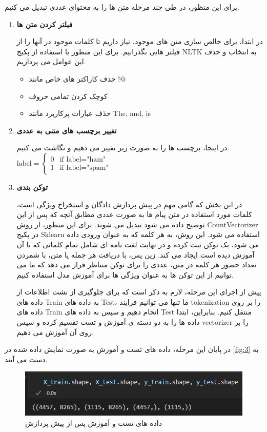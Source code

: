 \documentclass{article}
\begin{document}
برای این منظور، در طی چند مرحله متن ها را به محتوای عددی تبدیل می کنیم.
\begin{enumerate}
    \item \textbf{فیلتر کردن متن ها}
    
    در ابتدا، برای خالص سازی متن های موجود، نیاز داریم تا کلمات موجود در آنها را از فیلتر هایی بگذرانیم. برای این منظور با استفاده از پکیج NLTK
    به انتخاب و حذف این عوامل می پردازیم.
    \begin{itemize}
        \item حذف کاراکتر های خاص مانند $!@$
        \item کوچک کردن تمامی حروف
        \item حذف عبارات پرکاربرد مانند The, and, is
    \end{itemize}
    \item \textbf{تغییر برچسب های متنی به عددی}
    
    در اینجا، برچسب ها را به صورت زیر تغییر می دهیم و نگاشت می کنیم.
    $
\text{label} =
\begin{cases}
0 & \text{if } \text{label} = \text{"ham"} \\
1 & \text{if } \text{label} = \text{"spam"}
\end{cases}
$
\item \textbf{توکن بندی}

در این بخش که گامی مهم در پیش پردازش دادگان و استخراج ویژگی است، کلمات مورد استفاده در متن پیام ها به صورت عددی مطابق آنچه که پس از این توضیح داده می شود تبدیل می شوند. 
برای این منظور، از روش CountVectorizer در پکیج Sklearn استفاده می شود.
این روش، به هر کلمه که به عنوان ورودی داده می شود، یک توکن ثبت کرده و در نهایت لغت نامه ای شامل تمام کلماتی که با آن آموزش دیده است ایجاد می کند. زین پس، با دریافت هر جمله یا متن، با شمردن تعداد حضور هر کلمه در متن، عددی را برای توکن متناظر قرار می دهد که ما می توانیم از این توکن ها به عنوان ویژگی ها برای آموزش مدل استفاده کنیم.

پیش از اجرای این مرحله، لازم به ذکر است که برای جلوگیری از نشت اطلاعات از داده های Train به داده های Test، ما تنها می توانیم فرایند tokenization را بر روی داده های Train انجام دهیم و سپس به داده های Test منتقل کنیم. 
بنابراین، ابتدا داده ها را به دو دسته ی آموزش و تست تقسیم کرده و سپس vectorizer را بر روی آن آموزش می دهیم.

\end{enumerate}
در پایان این مرحله، داده های تست و آموزش به صورت نمایش داده شده در 
\autoref{fig:3}
به دست می آیند.
\begin{figure}
    \centering
    \includegraphics[width=0.75\linewidth]{3.png}
    \caption{داده های تست و آموزش پس از پیش پردازش}
    \label{fig:3}
\end{figure}
\clearpage
\end{document}
